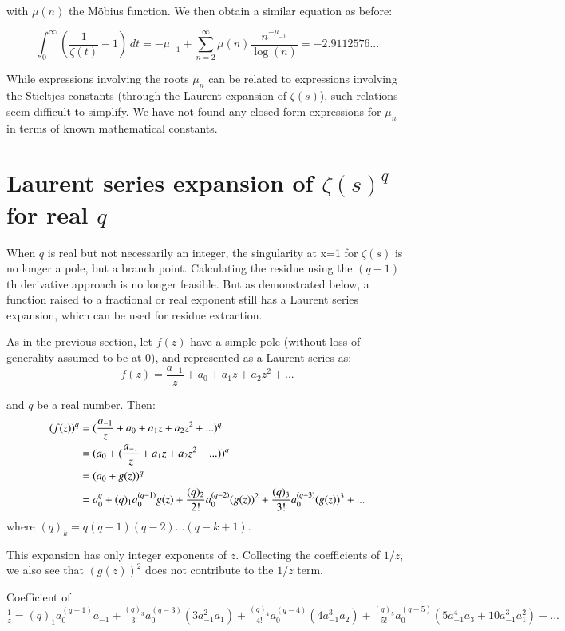 \documentclass[a4paper,11pt,twoside]{amsart}
\begin{document}
with $\mu(n)$ the Möbius function. We then obtain a similar equation as before:

\begin{equation}\label{zetPV7}
  \int_0^{\infty} \left(\frac{1}{\zeta(t)} -1\right) \,dt = -\mu_{-1}+\sum_{n=2}^{\infty} \mu(n)\frac{n^{-\mu_{-1}}}{\log(n)} = -2.9112576...
\end{equation}

While expressions involving the roots $\mu_n$ can be related to expressions involving the Stieltjes constants (through the Laurent expansion of $\zeta(s)$), such relations seem difficult to simplify. We have not found any closed form expressions for $\mu_n$ in terms of known mathematical constants.

\section{Laurent series expansion of $\zeta(s)^q$ for real $q$}
When $q$ is real but not necessarily an integer, the singularity at x=1 for $\zeta(s)$ is no longer a pole, but a branch point. Calculating the residue using the $(q-1)$th derivative approach is no longer feasible. But as demonstrated below, a function raised to a fractional or real exponent still has a Laurent series expansion, which can be used for residue extraction.

As in the previous section, let $f(z)$ have a simple pole (without loss of generality assumed to be at 0), and represented as a Laurent series as:
$$f(z) = \frac{a_{-1}}{z} + a_0 + a_1 z + a_2 z^2 + ...$$

and $q$ be a real number. Then:
\begin{align}
(f(z))^q &= (\frac{a_{-1}}{z} + a_0 + a_1 z + a_2 z^2 + ...)^q \notag\\
&= (a_0 + (\frac{a_{-1}}{z} + a_1 z + a_2 z^2 + ...))^q\notag\\
&= (a_0 + g(z))^q\notag\\
&= a_{0}^q + (q)_{1} a_{0}^{(q-1)} g(z) + \frac{(q)_{2}}{2!} a_{0}^{(q-2)} (g(z))^2 + \frac{(q)_{3}}{3!} a_{0}^{(q-3)} (g(z))^3 + ...\notag
\notag
\end{align}
where $(q)_k = q(q-1)(q-2)...(q-k+1)$.

This expansion has only integer exponents of $z$. Collecting the coefficients of $1/z$, we also see that $(g(z))^2$ does not contribute to the $1/z$ term.

Coefficient of $\frac{1}{z} = (q)_{1} a_{0}^{(q-1)} a_{-1} + \frac{(q)_{3}}{3!} a_{0}^{(q-3)} (3 a_{-1}^2 a_1) + \frac{(q)_{4}}{4!} a_{0}^{(q-4)} (4 a_{-1}^3 a_2) + \frac{(q)_{5}}{5!} a_{0}^{(q-5)} (5 a_{-1}^4 a_3 + 10 a_{-1}^3 a_{1}^2) + ...$
\end{document}
